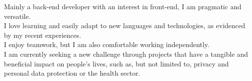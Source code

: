 \documentclass[8pt]{developercv} %
\begin{document}
\begin{minipage}[t]{0.5\textwidth} %
	\vspace{-0.5\baselineskip} %

	Mainly a back-end developer with an interest in front-end, I am pragmatic and versatile.\\
	I love learning and easily adapt to new languages and technologies, as evidenced by my recent experiences.\\
	I enjoy teamwork, but I am also comfortable working independently.\\

	I am currently seeking a new challenge through projects that have a tangible and beneficial impact on people's lives, such as, but not limited to, privacy and personal data protection or the health sector.
\end{minipage}
\hfill %
\begin{minipage}[t]{0.45\textwidth} %
	\vspace{-1.5\baselineskip} %
	\begin{barchart}{5.5}
	\end{barchart}
\end{minipage}

\vfill %
\end{document}
